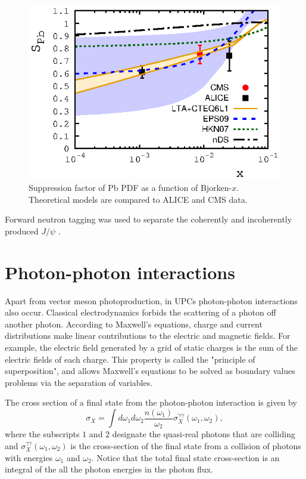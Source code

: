 \begin{figure}[h!]
\begin{centering}
\includegraphics[width=5in]{Chapter2/importfigs/S_pb208_2017_v2.eps}
\par\end{centering}
\caption{Suppression factor of Pb PDF as a function of Bjorken-$x$. Theoretical models are compared to ALICE and CMS data.\label{fig:f2Supp2}}
\end{figure}

Forward neutron tagging was used to separate the coherently and incoherently produced $J/\psi$ \cite{Guzey:2013jaa,Strikman:2005ze,lta2012.03,emPcite4,emPCite5,emPCite6,upcNeuPHENIX}.

\section{Photon-photon interactions}

Apart from vector meson photoproduction, in UPCs photon-photon interactions also occur. Classical electrodynamics forbids the scattering of a photon off another photon. According to Maxwell's equations, charge and current distributions make linear contributions to the electric and magnetic fields. For example, the electric field generated by a grid of static charges is the sum of the electric fields of each charge. This property is called the "principle of superposition", and allows Maxwell's equations to be solved as boundary values problems via the separation of variables.

The cross section of a final state from the photon-photon interaction is given by
\begin{equation}
\sigma_X = \int d \omega_1 d \omega_2 \frac{n(\omega_1)}{\omega_2} \sigma_X^{\gamma\gamma}(\omega_1, \omega_2),
\end{equation}
where the subscripts $1$ and $2$ designate the quasi-real photons that are colliding and 
$\sigma_X^{\gamma\gamma}(\omega_1, \omega_2)$ is the cross-section of the final state from a collision of photons with energies $\omega_1$ and $\omega_2$. Notice that the total final state cross-section is an integral of the all the photon energies in the photon flux. 

